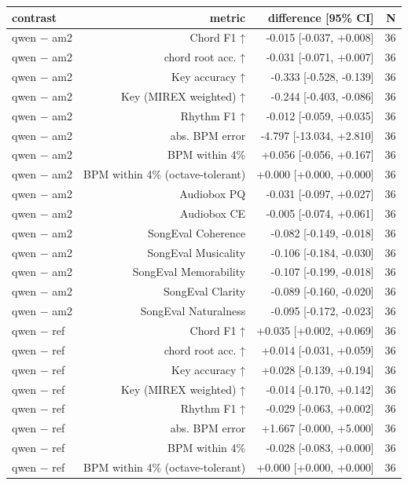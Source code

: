 \begin{table}[t]
\centering
\small
\begin{tabular}{lrrr}
\toprule
contrast & metric & difference [95\% CI] & N \\
\midrule
qwen $-$ am2 & Chord F1 ↑ & -0.015 [-0.037, +0.008] & 36 \\
qwen $-$ am2 & chord root acc. ↑ & -0.031 [-0.071, +0.007] & 36 \\
qwen $-$ am2 & Key accuracy ↑ & -0.333 [-0.528, -0.139] & 36 \\
qwen $-$ am2 & Key (MIREX weighted) ↑ & -0.244 [-0.403, -0.086] & 36 \\
qwen $-$ am2 & Rhythm F1 ↑ & -0.012 [-0.059, +0.035] & 36 \\
qwen $-$ am2 & abs. BPM error & -4.797 [-13.034, +2.810] & 36 \\
qwen $-$ am2 & BPM within 4\% & +0.056 [-0.056, +0.167] & 36 \\
qwen $-$ am2 & BPM within 4\% (octave-tolerant) & +0.000 [+0.000, +0.000] & 36 \\
qwen $-$ am2 & Audiobox PQ & -0.031 [-0.097, +0.027] & 36 \\
qwen $-$ am2 & Audiobox CE & -0.005 [-0.074, +0.061] & 36 \\
qwen $-$ am2 & SongEval Coherence & -0.082 [-0.149, -0.018] & 36 \\
qwen $-$ am2 & SongEval Musicality & -0.106 [-0.184, -0.030] & 36 \\
qwen $-$ am2 & SongEval Memorability & -0.107 [-0.199, -0.018] & 36 \\
qwen $-$ am2 & SongEval Clarity & -0.089 [-0.160, -0.020] & 36 \\
qwen $-$ am2 & SongEval Naturalness & -0.095 [-0.172, -0.023] & 36 \\
qwen $-$ ref & Chord F1 ↑ & +0.035 [+0.002, +0.069] & 36 \\
qwen $-$ ref & chord root acc. ↑ & +0.014 [-0.031, +0.059] & 36 \\
qwen $-$ ref & Key accuracy ↑ & +0.028 [-0.139, +0.194] & 36 \\
qwen $-$ ref & Key (MIREX weighted) ↑ & -0.014 [-0.170, +0.142] & 36 \\
qwen $-$ ref & Rhythm F1 ↑ & -0.029 [-0.063, +0.002] & 36 \\
qwen $-$ ref & abs. BPM error & +1.667 [-0.000, +5.000] & 36 \\
qwen $-$ ref & BPM within 4\% & -0.028 [-0.083, +0.000] & 36 \\
qwen $-$ ref & BPM within 4\% (octave-tolerant) & +0.000 [+0.000, +0.000] & 36 \\

\end{tabular}
\end{table}

